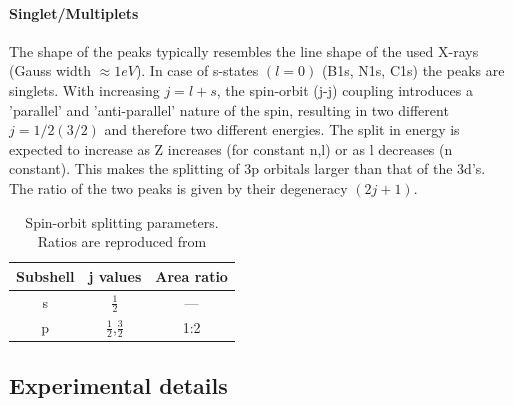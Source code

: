 \paragraph{Singlet/Multiplets}
The shape of the peaks typically resembles the line shape of the used X-rays (Gauss width $\approx 1eV$). In case of s-states $(l=0)$ (B1s, N1s, C1s) the peaks are singlets. With increasing $j=l+s$, the spin-orbit (j-j) coupling introduces a 'parallel' and 'anti-parallel' nature of the spin, resulting in two different $j=1/2(3/2)$ and therefore two different energies. The split in energy is expected to increase as Z increases (for constant n,l) or as l decreases (n constant). This makes the splitting of 3p orbitals larger than that of the 3d's. The ratio of the two peaks is given by their degeneracy $(2j+1)$.\cite[113]{Riviere_90}
\begin{table}
\caption{Spin-orbit splitting parameters. Ratios are reproduced from \cite{Riviere_90}}
\centering
 \begin{tabular}{ccc}
 Subshell & j values & Area ratio \\ \hline
 s & $\frac{1}{2}$ & --- \\
 p & $\frac{1}{2}$,$\frac{3}{2}$ & 1:2 \\
 \end{tabular}
\end{table}

%

\subsection{Experimental details}
